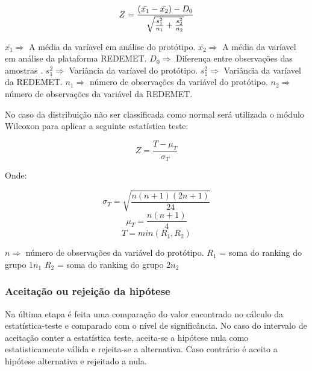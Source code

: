 \[\huge Z = \frac{(\bar{x_1} - \bar{x_2})-D_0}{\sqrt{\frac{s_1^2}{n_1} + \frac{s_2^2}{n_2}}}\]

{\raggedright $\bar{x_1} \Rightarrow$ A média da varíavel em análise do protótipo. 
\newline $\bar{x_2} \Rightarrow$ A média da varíavel em análise da plataforma REDEMET. 
\newline $D_0 \Rightarrow$ Diferença entre observações das amostras .
\newline $ s_1^2 \Rightarrow$ Variância da varíavel do protótipo.
\newline $ s_1^2 \Rightarrow$ Variância da varíavel da REDEMET.
\newline $ n_1 \Rightarrow$ número de observações da variável do protótipo.
\newline $ n_2 \Rightarrow$ número de observações da variável da REDEMET.
}

\setlength\parindent{2em}No caso da distribuição não ser classificada como normal será utilizada o módulo Wilcoxon para aplicar a seguinte estatística teste:

{\raggedright$$Z = \frac{T - \mu_T}{\sigma_T}$$

Onde:

$$\sigma_T = \sqrt{\frac{n(n + 1)(2n + 1)}{24}}$$
$$\mu_T = \frac{n(n+1)}{4}$$
$$T = min(R_1, R_2)$$

$ n \Rightarrow$ número de observações da variável do protótipo.
\newline $R_1$ = soma do ranking do grupo 1$n_1$
\newline $R_2$ = soma do ranking do grupo 2$n_2$
}

\subsubsection{Aceitação ou rejeição da hipótese}
\setlength\parindent{2em}
Na última etapa é feita uma comparação do valor encontrado no cálculo da estatística-teste e comparado com o nível de significância. No caso do intervalo de aceitação conter a estatística teste, aceita-se a hipótese nula como estatisticamente válida e rejeita-se a alternativa. Caso contrário é aceito a hipótese alternativa e rejeitado a nula.





